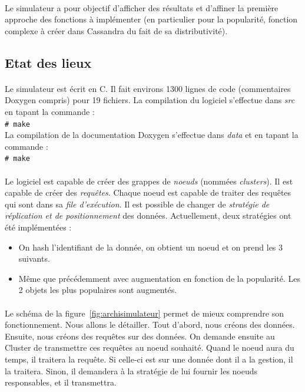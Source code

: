\documentclass[12pt]{article}
\newcommand{\shellcmd}[1]{\\\indent\indent\texttt{\footnotesize\# #1}\\}
\begin{document}
\paragraph{}Le simulateur a pour objectif d'afficher des résultats et d'affiner la première approche des fonctions à implémenter (en particulier pour la popularité, fonction complexe à créer dans Cassandra du fait de sa distributivité).

\subsection{Etat des lieux}

\paragraph{} Le simulateur est écrit en C. Il fait environs 1300 lignes de code (commentaires Doxygen compris) pour 19 fichiers. La compilation du logiciel s'effectue dans \textit{src} en tapant la commande  : \shellcmd{make}
La compilation de la documentation Doxygen s'effectue dans \textit{data} et en tapant la commande : \shellcmd{make}

\paragraph{}Le logiciel est capable de créer des grappes de \textit{noeuds} (nommées \textit{clusters}). Il est capable de créer des \textit{requêtes}. Chaque noeud est capable de traiter des requêtes qui sont dans sa \textit{file d'exécution}. Il est possible de changer de \textit{stratégie de réplication et de positionnement} des données. Actuellement, deux stratégies ont été implémentées :

\begin{itemize}
    \item On hash l'identifiant de la donnée, on obtient un noeud et on prend les 3 suivants.
    \item Même que précédemment avec augmentation en fonction de la popularité. Les 2 objets les plus populaires sont augmentés.
\end{itemize}

\paragraph{}Le schéma de la figure~\ref{fig:archisimulateur} permet de mieux comprendre son fonctionnement. Nous allons le détailler. \newline
Tout d'abord, nous créons des données. Ensuite, nous créons des requêtes sur des données. On demande ensuite au Cluster de transmettre ces requêtes au noeud souhaité. Quand le noeud aura du temps, il traitera la requête. Si celle-ci est sur une donnée dont il a la gestion, il la traitera. Sinon, il demandera à la stratégie de lui fournir les noeuds responsables, et il transmettra.
\end{document}
